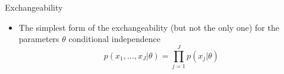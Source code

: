 \documentclass[finnish,english,t]{beamer}
\begin{document}
\begin{frame}{Exchangeability}

  \begin{itemize}
  \item The simplest form of the exchangeability (but not the only
    one) for the parameters $\theta$ conditional independence
    \begin{equation*}
      p(x_1,\ldots,x_J|\theta)=\prod_{j=1}^J p(x_j|\theta)
    \end{equation*}

   \end{itemize}
\end{frame}
\end{document}
